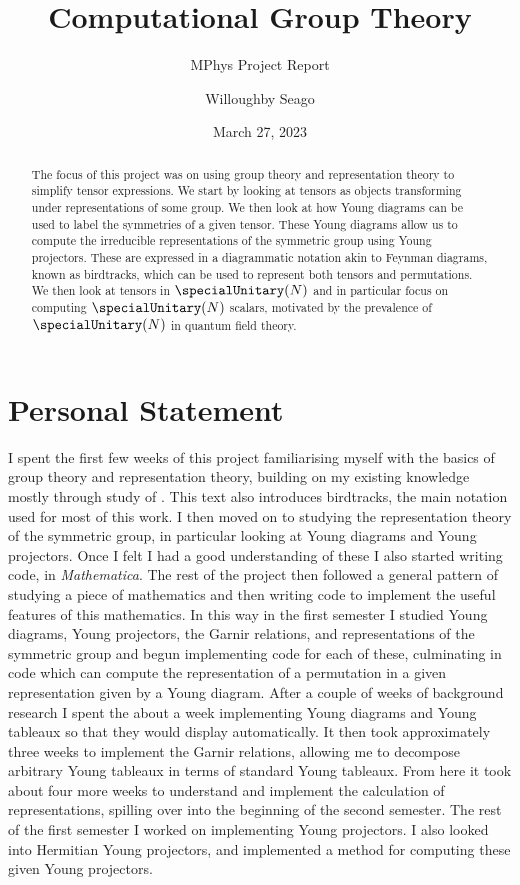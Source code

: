 \documentclass[fleqn]{NotesClass}
\title{Computational Group Theory}
\author{Willoughby Seago}
\date{March 27, 2023}
\subtitle{MPhys Project Report}
\newcommand{\Mathematica}{\textit{Mathematica}}
\begin{document}
    \frontmatter
    \titlepage
    \maketitle
    \begin{abstract}
        The focus of this project was on using group theory and representation theory to simplify tensor expressions.
        We start by looking at tensors as objects transforming under representations of some group.
        We then look at how Young diagrams can be used to label the symmetries of a given tensor.
        These Young diagrams allow us to compute the irreducible representations of the symmetric group using Young projectors.
        These are expressed in a diagrammatic notation akin to Feynman diagrams, known as birdtracks, which can be used to represent both tensors and permutations.
        We then look at tensors in \(\specialUnitary(N)\) and in particular focus on computing \(\specialUnitary(N)\) scalars, motivated by the prevalence of \(\specialUnitary(N)\) in quantum field theory.
    \end{abstract}
    \tableofcontents
    \chapter{Personal Statement}
    I spent the first few weeks of this project familiarising myself with the basics of group theory and representation theory, building on my existing knowledge mostly through study of \cite{cvitanovic}.
    This text also introduces birdtracks, the main notation used for most of this work.
    I then moved on to studying the representation theory of the symmetric group, in particular looking at Young diagrams and Young projectors.
    Once I felt I had a good understanding of these I also started writing code, in \Mathematica{}.
    The rest of the project then followed a general pattern of studying a piece of mathematics and then writing code to implement the useful features of this mathematics.
    In this way in the first semester I studied Young diagrams, Young projectors, the Garnir relations, and representations of the symmetric group and begun implementing code for each of these, culminating in code which can compute the representation of a permutation in a given representation given by a Young diagram.
    After a couple of weeks of background research I spent the about a week implementing Young diagrams and Young tableaux so that they would display automatically.
    It then took approximately three weeks to implement the Garnir relations, allowing me to decompose arbitrary Young tableaux in terms of standard Young tableaux.
    From here it took about four more weeks to understand and implement the calculation of representations, spilling over into the beginning of the second semester.
    The rest of the first semester I worked on implementing Young projectors.
    I also looked into Hermitian Young projectors, and implemented a method for computing these given Young projectors.
    
\end{document}
